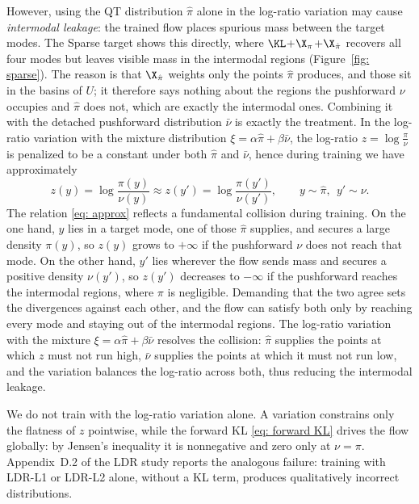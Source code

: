 \documentclass{article}
\begin{document}
However, using the QT distribution $\hat\pi$ alone in the log-ratio variation may cause \emph{intermodal leakage}: the trained flow places spurious mass between the target modes. The Sparse target shows this directly, where $\KL$+$\X_\pi$+$\X_{\hat\pi}$ recovers all four modes but leaves visible mass in the intermodal regions (Figure~\ref{fig: sparse}). The reason is that $\X_{\hat\pi}$ weights only the points $\hat\pi$ produces, and those sit in the basins of $U$; it therefore says nothing about the regions the pushforward $\nu$ occupies and $\hat\pi$ does not, which are exactly the intermodal ones. Combining it with the detached pushforward distribution $\bar\nu$ is exactly the treatment. In the log-ratio variation with the mixture distribution $\xi =\alpha\hat\pi+\beta\bar\nu$, the log-ratio $z=\log\frac{\pi}{\nu}$ is penalized to be a constant under both $\hat\pi$ and $\bar\nu$, hence during training we have approximately
\begin{equation}
	z(y) = \log\frac{\pi(y)}{\nu(y)} \approx z(y') = \log\frac{\pi(y')}{\nu(y')}, \qquad
	y\sim \hat\pi,~~y'\sim\nu.
	\label{eq: approx} 
\end{equation}
The relation \eqref{eq: approx} reflects a fundamental collision during training. On the one hand, $y$ lies in a target mode, one of those $\hat\pi$ supplies, and secures a large density $\pi(y)$, so $z(y)$ grows to $+\infty$ if the pushforward $\nu$ does not reach that mode. On the other hand, $y'$ lies wherever the flow sends mass and secures a positive density $\nu(y')$, so $z(y')$ decreases to $-\infty$ if the pushforward reaches the intermodal regions, where $\pi$ is negligible. Demanding that the two agree sets the divergences against each other, and the flow can satisfy both only by reaching every mode and staying out of the intermodal regions. The log-ratio variation with the mixture $\xi = \alpha\hat\pi+\beta\bar\nu$ resolves the collision: $\hat\pi$ supplies the points at which $z$ must not run high, $\bar\nu$ supplies the points at which it must not run low, and the variation balances the log-ratio across both, thus reducing the intermodal leakage.


\begin{remark}
	We do not train with the log-ratio variation alone. A variation constrains only the flatness of $z$ pointwise, while the forward KL \eqref{eq: forward KL} drives the flow globally: by Jensen's inequality it is nonnegative and zero only at $\nu=\pi$. Appendix~D.2 of the LDR study \citep{schopmans2026ldr} reports the analogous failure: training with LDR-L1 or LDR-L2 alone, without a KL term, produces qualitatively incorrect distributions.
\end{remark}
\end{document}

